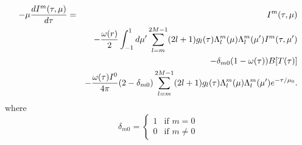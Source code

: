 \begin{eqnarray}
 - \mu {dI^m(\tau,\mu) \over d\tau}& =& I^m(\tau,\mu) 
 \nonumber \\ & & -
  {\omega(r) \over 2 } \int^{1}_{-1}d\mu'
   \sum_{l=m}^{2M-1} (2l+1) g_l(\tau) \Lambda_l^m(\mu) \Lambda_l^m(\mu') I^m(\tau,\mu')
 \nonumber \\ & & 
   -\delta_{m0}(1-\omega(\tau))B[T(\tau)] 
\nonumber \\
& &    -\frac{\omega(\tau)I^{0}}{4\pi} (2-\delta_{m0}) 
        \sum_{l=m}^{2M-1} (2l+1) g_l(\tau) \Lambda_l^m(\mu) \Lambda_l^m(\mu') e^{-\tau/\mu_{0}}.\nonumber\\
  \label{eq:DiffuseRTEseparated}
\end{eqnarray}
where 
\begin{displaymath}
\delta_{m0} = \left\{ \begin{array}{ll}
      1 & \text{if $m=0$} \\
      0 & \text{if $m\neq 0$} 
      \end{array} \right.
\end{displaymath}



